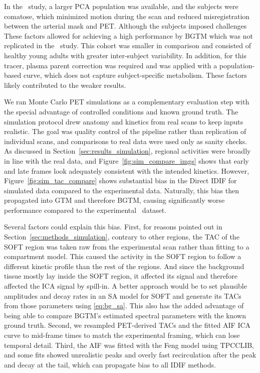 In the \fdg\ study, a larger PCA population was available, and the subjects were comatose, which minimized motion during the scan and reduced misregistration between the arterial mask and PET.
Although the subjects imposed challenges 
These factors allowed for achieving a high performance by BGTM which was not replicated in the \yohimbine\ study.
This cohort was smaller in comparison and consisted of healthy young adults with greater inter-subject variability.
In addition, for this tracer, plasma parent correction was required and was applied with a population-based curve, which does not capture subject-specific metabolism.
These factors likely contributed to the weaker results.

We ran Monte Carlo PET simulations as a complementary evaluation step with the special advantage of controlled conditions and known ground truth.
The simulation protocol drew anatomy and kinetics from real scans to keep inputs realistic.
The goal was quality control of the pipeline rather than replication of individual scans, and comparisons to real data were used only as sanity checks.
As discussed in Section~\ref{sec:results_simulation}, regional activities were broadly in line with the real data, and Figure~\ref{fig:sim_compare_imgs} shows that early and late frames look adequately consistent with the intended kinetics.
However, Figure~\ref{fig:sim_tac_compare} shows substantial bias in the Direct IDIF for simulated data compared to the experimental data.
Naturally, this bias then propagated into GTM and therefore BGTM, causing significantly worse performance compared to the experimental \fdg\ dataset.

Several factors could explain this bias.
First, for reasons pointed out in Section~\ref{sec:methods_simulation}, contrary to other regions, the TAC of the SOFT region was taken raw from the experimental scan rather than fitting to a compartment model.
This caused the activity in the SOFT region to follow a different kinetic profile than the rest of the regions.
And since the background tissue mostly lay inside the SOFT region, it affected its signal and therefore affected the ICA signal by spill-in.
A better approach would be to set plausible amplitudes and decay rates in an SA model for SOFT and generate its TACs from those parameters using \eqref{eq:bg_sa}.
This also has the added advantage of being able to compare BGTM’s estimated spectral parameters with the known ground truth.
Second, we resampled PET-derived TACs and the fitted AIF ICA curve to mid-frame times to match the experimental framing, which can lose temporal detail.
Third, the AIF was fitted with the Feng model using TPCCLIB, and some fits showed unrealistic peaks and overly fast recirculation after the peak and decay at the tail, which can propagate bias to all IDIF methods.

